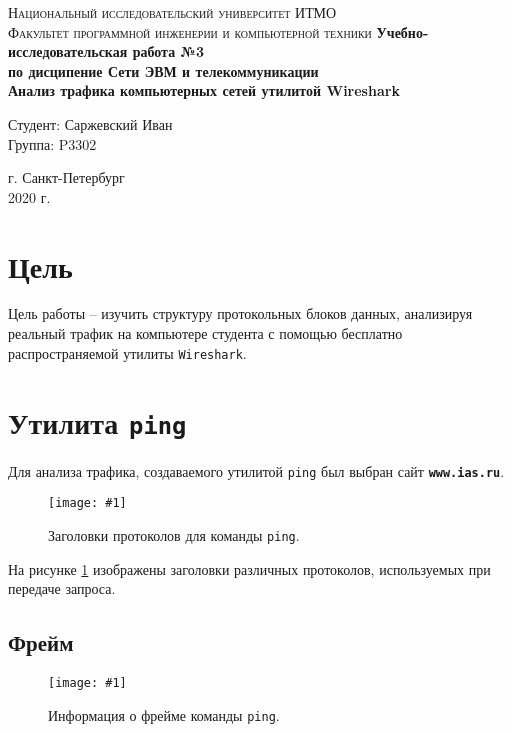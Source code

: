 \documentclass[12pt, a4paper]{article}
\newcommand{\figc}[4]{
  \begin{figure}[h]
  \begin{center}
    \texttt{[image: \#1]}
    \caption{#2}
    \label{fig:#3}
  \end{center}
  \end{figure}
}
\begin{document}
\begin{titlepage}
\begin{center}

\textsc{Национальный исследовательский университет ИТМО\\[4mm]
Факультет программной инженерии и компьютерной техники}
\vfill
\textbf{Учебно-исследовательская работа №3\\[4mm]
по дисципение Сети ЭВМ и телекоммуникации\\[4mm]
Анализ трафика компьютерных сетей утилитой Wireshark\\[16mm]
}
\begin{flushright}
Студент: Саржевский Иван
\\[2mm]Группа: P3302
\end{flushright}
\vfill
г. Санкт-Петербург\\[2mm]
2020 г.

\end{center}
\end{titlepage}

\tableofcontents
\newpage

\justify

\section{Цель}

Цель работы – изучить структуру протокольных блоков данных, анализируя реальный
трафик на компьютере студента с помощью бесплатно распространяемой утилиты
\texttt{Wireshark}.

\section{Утилита \texttt{ping}}

Для анализа трафика, создаваемого утилитой \texttt{ping} был выбран сайт
\textbf{\texttt{www.ias.ru}}.

\figc{ping_headers}{Заголовки протоколов для команды \texttt{ping}.}{p_h}{3.0}

На рисунке \ref{fig:p_h} изображены заголовки различных протоколов, используемых
при передаче запроса.

\subsection{Фрейм}

\figc{ping_frame}{Информация о фрейме команды \texttt{ping}.}{p_f}{3.0}
\end{document}
